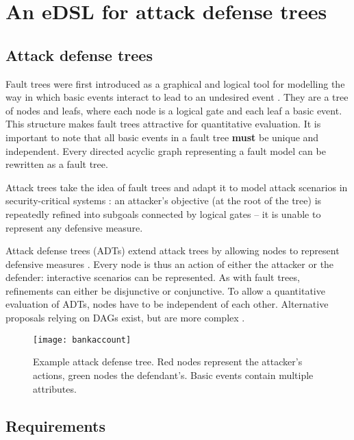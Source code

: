 \documentclass{scrreprt}
\begin{document}

\chapter{An eDSL for attack defense trees}

\section{Attack defense trees}

Fault trees were first introduced as a graphical and logical tool for modelling
the way in which basic events interact to lead to an undesired event
\cite[IV.1]{Vesely1981}. They are a tree of nodes and leafs, where each node is
a logical gate and each leaf a basic event. This structure makes fault trees
attractive for quantitative evaluation. It is important to note that all basic
events in a fault tree \textbf{must} be unique and independent. Every directed
acyclic graph representing a fault model can be rewritten as a fault tree.

Attack trees take the idea of fault trees and adapt it to model attack scenarios
in security-critical systems \cite{Schneier1999} \cite{Brooke2003}
\cite{NaiFovino2009}: an attacker's objective (at the root of the tree) is
repeatedly refined into subgoals connected by logical gates -- it is unable to
represent any defensive measure.

Attack defense trees (ADTs) extend attack trees by allowing nodes to represent
defensive measures \cite{Kordy}. Every node is thus an action of either the
attacker or the defender: interactive scenarios can be represented. As with
fault trees, refinements can either be disjunctive or conjunctive. To allow a
quantitative evaluation of ADTs, nodes have to be independent of each other.
Alternative proposals relying on DAGs exist, but are more complex
\cite{Kordy2013a}.

\begin{figure}[h]
    \centering
    \texttt{[image: bankaccount]}
    \caption{Example attack defense tree. Red nodes represent the attacker's
    actions, green nodes the defendant's. Basic events contain multiple
    attributes.}
\end{figure}



\section{Requirements}
\end{document}
